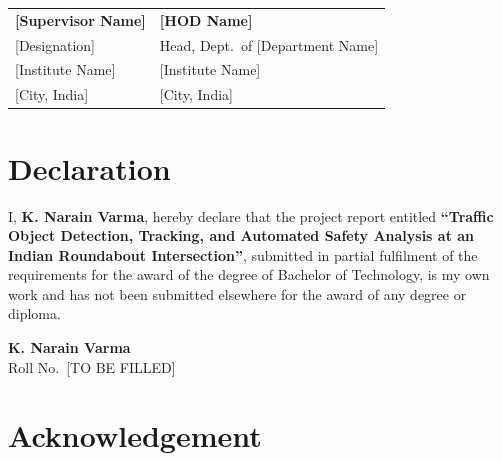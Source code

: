 \documentclass[12pt,a4paper]{report}
\begin{document}
\vspace{2cm}
\noindent
\begin{tabular}{p{7cm}p{7cm}}
\textbf{[Supervisor Name]} & \textbf{[HOD Name]}\\
{[Designation]}            & Head, Dept.\ of [Department Name]\\
{[Institute Name]}         & [Institute Name]\\
{[City, India]}            & [City, India]\\
\end{tabular}

\clearpage\thispagestyle{empty}

\newpage\thispagestyle{empty}
\chapter*{Declaration}

\noindent
I, \textbf{K. Narain Varma}, hereby declare that the project report entitled
\textbf{``Traffic Object Detection, Tracking, and Automated Safety Analysis at an Indian
Roundabout Intersection''}, submitted in partial fulfilment of the requirements for the
award of the degree of Bachelor of Technology, is my own work and has not been submitted
elsewhere for the award of any degree or diploma.

\vspace{2cm}
\noindent
\textbf{K. Narain Varma}\\
Roll No.\ [TO BE FILLED]\\
[Date]

\clearpage\thispagestyle{empty}

\newpage\thispagestyle{empty}
\chapter*{Acknowledgement}


\clearpage\thispagestyle{empty}
\end{document}
